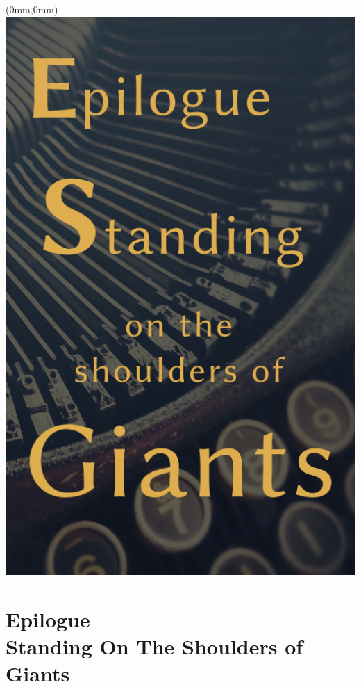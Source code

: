 \documentclass[11.75pt,openany,final]{memoir}
\begin{document}
\chapter*{}
\begin{textblock*}{70.9mm}(0mm,0mm)
\includegraphics[width=\paperwidth]{./media/images/type}
\end{textblock*}

\chapter{Epilogue\\ \small{Standing On The Shoulders of Giants}}
\label{ch:epilogue}

\end{document}
